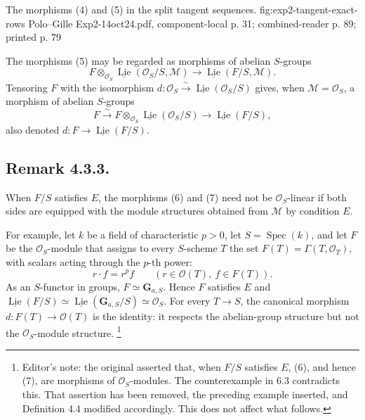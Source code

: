   {The morphisms (4) and (5) in the split tangent sequences.}
  {fig:exp2-tangent-exact-rows}
  {Polo--Gille Exp2-14oct24.pdf, component-local p. 31; combined-reader p. 89; printed p. 79}

The morphisms (5) may be regarded as morphisms of abelian \(S\)-groups
\begin{equation}
 F\otimes_{\mathcal O_S}
 \underline{\operatorname{Lie}}(\mathcal O_S/S,\mathcal M)
 \longrightarrow
 \underline{\operatorname{Lie}}(F/S,\mathcal M).
 \tag{6}
\end{equation}
Tensoring \(F\) with the isomorphism
\(d:\mathcal O_S\xrightarrow{\sim}
\underline{\operatorname{Lie}}(\mathcal O_S/S)\) gives, when
\(\mathcal M=\mathcal O_S\), a morphism of abelian \(S\)-groups
\begin{equation}
 F\xrightarrow{\sim}
 F\otimes_{\mathcal O_S}
 \underline{\operatorname{Lie}}(\mathcal O_S/S)
 \longrightarrow \underline{\operatorname{Lie}}(F/S),
 \tag{7}
\end{equation}
also denoted \(d:F\to\underline{\operatorname{Lie}}(F/S)\).

\subsection*{Remark 4.3.3.}
When \(F/S\) satisfies \(E\), the morphisms (6) and (7) need not be
\(\mathcal O_S\)-linear if both sides are equipped with the module
structures obtained from \(\mathcal M\) by condition \(E\).

For example, let \(k\) be a field of characteristic \(p>0\), let
\(S=\operatorname{Spec}(k)\), and let \(F\) be the
\(\mathcal O_S\)-module that assigns to every \(S\)-scheme \(T\) the
set \(F(T)=\Gamma(T,\mathcal O_T)\), with scalars acting through the
\(p\)-th power:
\[
 r\cdot f=r^pf
 \qquad(r\in\mathcal O(T),\ f\in F(T)).
\]
As an \(S\)-functor in groups, \(F\simeq\mathbf G_{a,S}\). Hence \(F\)
satisfies \(E\) and
\(\underline{\operatorname{Lie}}(F/S)\simeq
\underline{\operatorname{Lie}}(\mathbf G_{a,S}/S)\simeq\mathcal O_S\).
For every \(T\to S\), the canonical morphism
\(d:F(T)\to\mathcal O(T)\) is the identity: it respects the abelian-group
structure but not the \(\mathcal O_S\)-module structure.
\footnote{Editor's note: the original asserted that, when \(F/S\)
satisfies \(E\), (6), and hence (7), are morphisms of
\(\mathcal O_S\)-modules. The counterexample in 6.3 contradicts this.
That assertion has been removed, the preceding example inserted, and
Definition 4.4 modified accordingly. This does not affect what follows.}

